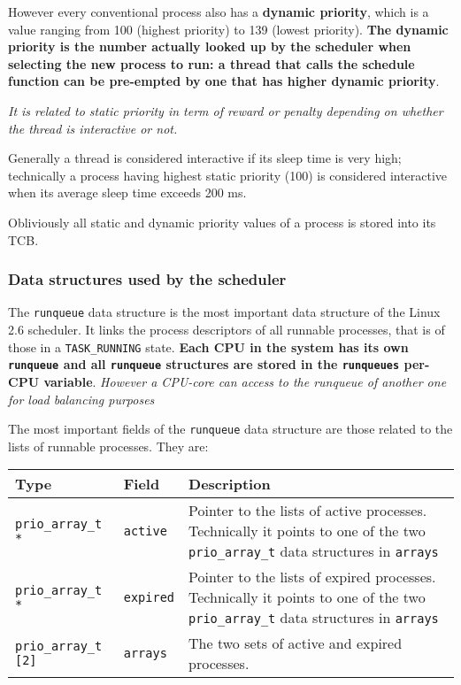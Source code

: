 \documentclass[10pt,a4paper]{article}
\begin{document}
However every conventional process also has a \textbf{dynamic priority}, which is a value ranging from 100 (highest priority) to 139 (lowest priority). \textbf{The dynamic priority is the number actually looked up by the scheduler when selecting the new process to run: a thread that calls the schedule function can be pre-empted by one that has higher dynamic priority}.

\textit{It is related to static priority in term of reward or penalty depending on whether the thread is interactive or not.}

Generally a thread is considered interactive if its sleep time is very high; technically a process having highest static priority (100) is considered interactive when its average sleep time exceeds 200 ms. 

Obliviously all static and dynamic priority values of a process is stored into its TCB.

\subsubsection{Data structures used by the scheduler}

The \texttt{runqueue} data structure is the most important data structure of the Linux 2.6 scheduler. It links the process descriptors of all
runnable processes, that is of those in a \texttt{TASK\_RUNNING} state. \textbf{Each CPU in the system has its own \texttt{runqueue} and all \texttt{runqueue} structures are stored in the \texttt{runqueues} per-CPU variable}. \textit{However a CPU-core can access to the runqueue of another one for load balancing purposes}

The most important fields of the \texttt{runqueue} data structure are those related to the lists of runnable processes. They are:

\begin{center}
\begin{tabular}{l|l|p{13cm}} 

\toprule
Type & Field & Description \\
\midrule

\texttt{prio\_array\_t *} & \texttt{active} & Pointer to the lists of active processes. Technically it points to one of the two \texttt{prio\_array\_t} data structures in \texttt{arrays}

\\
\texttt{prio\_array\_t *} & \texttt{expired} & Pointer to the lists of expired processes. Technically it points to one of the two \texttt{prio\_array\_t} data structures in \texttt{arrays}


\\
\texttt{prio\_array\_t [2]} & \texttt{arrays} & The two sets of active and expired processes.


\\
\bottomrule
\end{tabular}
\end{center}
\end{document}
